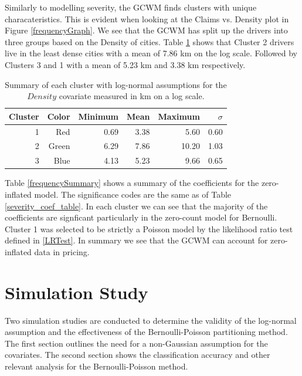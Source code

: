 \documentclass[11pt,letterpaper]{article}
\numberwithin{equation}{section}
\numberwithin{equation}{section}
\numberwithin{equation}{section}
\begin{document}
Similarly to modelling severity, the GCWM finds clusters with unique characateristics. This is evident when looking at the Claims vs. Density plot in Figure \ref{frequencyGraph}. We see that the GCWM has split up the drivers into three groups based on the Density of cities. Table \ref{summarycovariates} shows that Cluster 2 drivers live in the least dense cities with a mean of 7.86 km on the log scale. Followed by Clusters 3 and 1 with a mean of 5.23 km and 3.38 km respectively.

 \begin{table}[!htb]
 \begin{center}
 \caption{Summary of each cluster with log-normal assumptions for the $Density$ covariate measured in km on a log scale.} \label{summarycovariates}
\begin{tabular}{rrrrrr}
\hline
\hline
Cluster  & Color & Minimum & Mean & Maximum & $\sigma$  \\
\hline
1 &   Red         & 0.69    & 3.38 & 5.60    & 0.60  \\
2 &  Green       & 6.29    & 7.86 & 10.20   & 1.03  \\
3 &  Blue        & 4.13    & 5.23 & 9.66    & 0.65 \\
\hline\hline
\end{tabular}
\end{center}
\end{table}

Table \ref{frequencySummary} shows a summary of the coefficients for the zero-inflated model. The
significance codes are the same as of Table \ref{severity_coef_table}. In each cluster we can see that the majority of the coefficients are signficant particularly in the zero-count model for Bernoulli. Cluster 1 was selected to be strictly a Poisson model by the likelihood ratio test defined in \eqref{LRTest}. In summary we see that the GCWM can account for zero-inflated data in pricing.


\section{Simulation Study}

Two simulation studies are conducted to determine the validity of the log-normal assumption and the effectiveness of the Bernoulli-Poisson partitioning method. The first section outlines the need for a non-Gaussian assumption for the covariates. The second section shows the classification accuracy and other relevant analysis for the Bernoulli-Poisson method.
\end{document}
